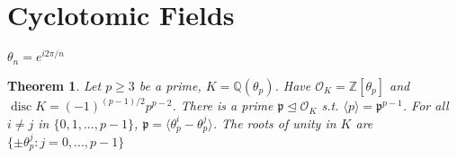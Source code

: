 \documentclass{article}
\theoremstyle{definition}
\theoremstyle{remark}
\theoremstyle{plain}
\newtheorem{thm}[defn]{Theorem}
\newcommand{\ZZ}{\mathbb{Z}}
\newcommand{\QQ}{\mathbb{Q}}
\newcommand{\disc}{\operatorname{disc}}
\begin{document}
\section{Cyclotomic Fields}
$\theta_n=e^{i2\pi/n}$
\begin{thm}
    Let $p\ge 3$ be a prime, $K=\QQ(\theta_p)$. Have $\mathcal O_K=\ZZ[\theta_p]$ and $\disc K=(-1)^{(p-1)/2}p^{p-2}$. There is a prime $\mathfrak p\trianglelefteq\mathcal O_K$ s.t. $\langle p\rangle=\mathfrak p^{p-1}$. For all $i\neq j$ in $\{0,1,...,p-1\}$, $\mathfrak p=\langle \theta_p^i-\theta_p^j\rangle$. The roots of unity in $K$ are $\{\pm\theta_p^j:j=0,...,p-1\}$
\end{thm}
\end{document}
